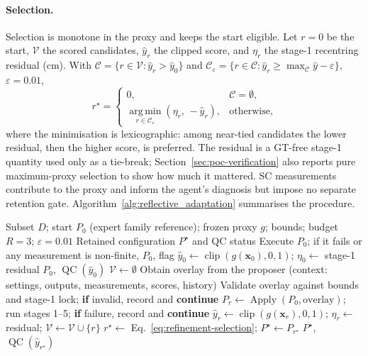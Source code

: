\documentclass[a4paper,fleqn]{cas-dc}
\begin{document}
\paragraph{Selection.}
Selection is monotone in the proxy and keeps the start eligible. Let $r=0$ be the start, $\mathcal V$ the scored candidates, $\hat y_r$ the clipped score, and $\eta_r$ the stage-1 recentring residual (cm). With $\mathcal C=\{r\in\mathcal V:\hat y_r>\hat y_0\}$ and $\mathcal C_\varepsilon=\{r\in\mathcal C:\hat y_r\ge\max_{\mathcal C}\hat y-\varepsilon\}$, $\varepsilon=0.01$,
\begin{equation}
r^\star=
\begin{cases}
0, & \mathcal C=\emptyset,\\
\operatorname*{arg\,min}_{r\in\mathcal C_\varepsilon}(\eta_r,\,-\hat y_r), & \text{otherwise},
\end{cases}
\label{eq:refinement-selection}
\end{equation}
where the minimisation is lexicographic: among near-tied candidates the lower residual, then the higher score, is preferred. The residual is a GT-free stage-1 quantity used only as a tie-break; Section~\ref{sec:poc-verification} also reports pure maximum-proxy selection to show how much it mattered. SC measurements contribute to the proxy and inform the agent's diagnosis but impose no separate retention gate. Algorithm~\ref{alg:reflective_adaptation} summarises the procedure.

\begin{algorithm}[!htb]
\caption{Proxy-guided parameter refinement}
\label{alg:reflective_adaptation}
\small
\begin{algorithmic}[1]
\Require Subset $D$; start $P_0$ (expert family reference); frozen proxy $g$; bounds; budget $R=3$; $\varepsilon=0.01$
\Ensure Retained configuration $P^\star$ and QC status
\State Execute $P_0$; if it fails or any measurement is non-finite, \Return $P_0$, flag
\State $\hat y_0\gets\operatorname{clip}(g(\mathbf x_0),0,1)$; $\eta_0\gets$ stage-1 residual
 \Return $P_0$, $\operatorname{QC}(\hat y_0)$ 
\EndIf
\State $\mathcal V\gets\emptyset$
  \State Obtain overlay from the proposer (context: settings, outputs, measurements, scores, history)
  \State Validate overlay against bounds and stage-1 lock; \textbf{if} invalid, record and \textbf{continue}
  \State $P_r\gets\operatorname{Apply}(P_0,\text{overlay})$; run stages 1--5; \textbf{if} failure, record and \textbf{continue}
  \State $\hat y_r\gets\operatorname{clip}(g(\mathbf x_r),0,1)$; $\eta_r\gets$ residual; $\mathcal V\gets\mathcal V\cup\{r\}$
\EndFor
\State $r^\star\gets$ Eq.~\eqref{eq:refinement-selection}; $P^\star\gets P_{r^\star}$
\State \Return $P^\star$, $\operatorname{QC}(\hat y_{r^\star})$
\end{algorithmic}
\end{algorithm}
\end{document}
